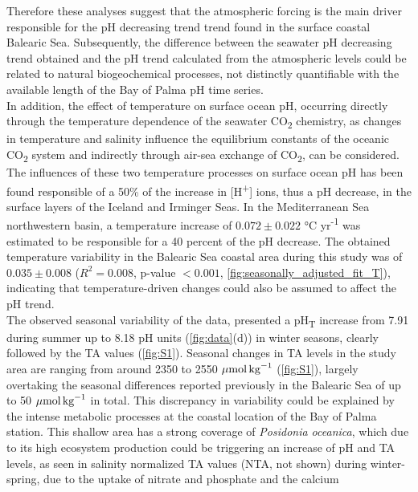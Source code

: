 Therefore these analyses suggest that the atmospheric forcing is the main
driver responsible for the pH decreasing trend trend found in the surface
coastal Balearic Sea. Subsequently, the difference between the seawater pH
decreasing trend obtained and the pH trend calculated from the atmospheric
levels could be related to natural biogeochemical processes, not distinctly
quantifiable with the available length of the Bay of Palma pH time series.\\
In addition, the effect of temperature on surface ocean pH, occurring
directly through the temperature dependence of the seawater CO\textsubscript{2}
chemistry, as changes in temperature and salinity influence the equilibrium
constants of the oceanic CO\textsubscript{2} system and indirectly through
air-sea exchange of CO\textsubscript{2}, can be considered. The influences of
these two temperature processes on surface ocean pH has been found responsible
of a 50\% of the increase in [H\textsuperscript{+}] ions, thus a pH decrease,
in the surface layers of the Iceland and Irminger
Seas\cite{perez2021contrasting}. In the Mediterranean Sea northwestern basin, a
temperature increase of $0.072\pm 0.022$ °C yr\textsuperscript{-1} was
estimated to be responsible for a 40 percent of the pH
decrease\cite{Kapsenberg2017}. The obtained temperature variability in the
Balearic Sea coastal area during this study was of $0.035\pm 0.008$
($R^2=0.008$, p-value $<0.001$, \cref{fig:seasonally_adjusted_fit_T}),
indicating that temperature-driven changes could also be assumed to affect the
pH trend.\\
The observed seasonal variability of the data, presented a
pH\textsubscript{T} increase from 7.91 during summer up to 8.18 pH units
(\cref{fig:data}(d)) in winter seasons, clearly followed by the TA values
(\cref{fig:S1}). Seasonal changes in TA levels in the study area are ranging
from around 2350 to 2550 ${\mu \textrm{mol\,kg}^{-1}}$ (\cref{fig:S1}), largely
overtaking the seasonal differences reported previously in the Balearic Sea of
up to 50 ${\mu \textrm{mol\,kg}^{-1}}$ in
total\cite{cossarini2015spatiotemporal}. This discrepancy in variability could
be explained by the intense metabolic processes at the coastal location of the
Bay of Palma station. This shallow area has a strong coverage of
\emph{Posidonia oceanica}, which due to its high ecosystem
production\cite{koopmans2020high} could be triggering an increase of pH and TA
levels, as seen in salinity normalized TA values (NTA, not shown) during
winter-spring, due to the uptake of nitrate and phosphate and the calcium
